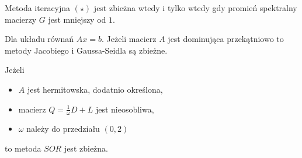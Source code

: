\documentclass[../mn-notatki.tex]{subfiles}
\begin{document}
\begin{tcolorbox}
Metoda iteracyjna $(\star)$ jest zbieżna wtedy i tylko wtedy gdy promień
spektralny macierzy $G$ jest mniejszy od $1$.
\end{tcolorbox}

\begin{tcolorbox}
Dla układu równań $Ax = b$. Jeżeli macierz $A$ jest dominująca przekątniowo
to metody Jacobiego i Gaussa-Seidla są zbieżne.
\end{tcolorbox}

\begin{tcolorbox}
Jeżeli
\begin{itemize}
    \item $A$ jest hermitowska, dodatnio określona,
    \item macierz $Q = \frac{1}{\omega} D + L$ jest nieosobliwa,
    \item $\omega$ należy do przedziału $(0,2)$
\end{itemize}
to metoda $SOR$ jest zbieżna.
\end{tcolorbox}

\pagebreak
\end{document}
